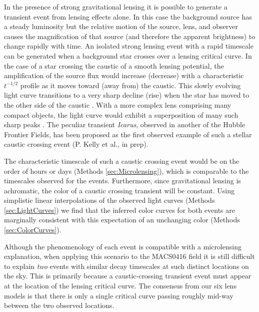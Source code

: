 In the presence of strong gravitational lensing it is possible to
generate a transient event from lensing effects alone.  In this case
the background source has a steady luminosity but the relative motion
of the source, lens, and observer causes the magnification of that
source (and therefore the apparent brightness) to change rapidly with
time.  An isolated strong lensing event with a rapid timescale can be
generated when a background star crosses over a lensing critical
curve.  In the case of a star crossing the caustic of a smooth lensing
potential, the amplification of the source flux would increase
(decrease) with a characteristic $t^{-1/2}$ profile as it moves toward
(away from) the caustic. This slowly evolving light curve transitions
to a very sharp decline (rise) when the star has moved to the other
side of the caustic \citep{Schneider:1986, MiraldaEscude:1991}.  With
a more complex lens comprising many compact objects, the light curve
would exhibit a superposition of many such sharp peaks
\citep{Lewis:1993}. The peculiar transient {\it Icarus}, observed in
another of the Hubble Frontier Fields, has been proposed as the first
observed example of such a stellar caustic crossing event (P. Kelly et
al., in prep).

The characteristic timescale of such a caustic crossing event would be
on the order of hours or days (Methods \ref{sec:Microlensing}), which
is comparable to the timescales observed for the \spock events.
Furthermore, since gravitational lensing is achromatic, the color of a
caustic crossing transient will be constant.  Using simplistic linear
interpolations of the observed light curves (Methods
\ref{sec:LightCurves}) we find that the inferred color curves for both
\spock events are marginally consistent with this expectation of an
unchanging color (Methods \ref{sec:ColorCurves}).

Although the phenomenology of each \spock event is compatible with a
microlensing explanation, when applying this scenario to the MACS0416
field it is still difficult to explain {\it two} events with similar
decay timescales at such distinct locations on the sky.  This is primarily
because a caustic-crossing transient event must appear at
the location of the lensing critical curve.  The consensus from our
six lens models is that there is only a single critical curve passing
roughly mid-way between the two observed \spock locations.


